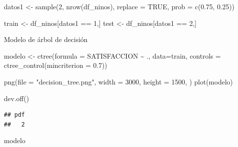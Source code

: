 \documentclass[
]{article}
\newenvironment{Shaded}{\begin{snugshade}}{\end{snugshade}}
\newcommand{\AttributeTok}[1]{\textcolor[rgb]{0.77,0.63,0.00}{#1}}
\newcommand{\ConstantTok}[1]{\textcolor[rgb]{0.00,0.00,0.00}{#1}}
\newcommand{\DecValTok}[1]{\textcolor[rgb]{0.00,0.00,0.81}{#1}}
\newcommand{\FloatTok}[1]{\textcolor[rgb]{0.00,0.00,0.81}{#1}}
\newcommand{\FunctionTok}[1]{\textcolor[rgb]{0.00,0.00,0.00}{#1}}
\newcommand{\NormalTok}[1]{#1}
\newcommand{\OtherTok}[1]{\textcolor[rgb]{0.56,0.35,0.01}{#1}}
\newcommand{\SpecialCharTok}[1]{\textcolor[rgb]{0.00,0.00,0.00}{#1}}
\newcommand{\StringTok}[1]{\textcolor[rgb]{0.31,0.60,0.02}{#1}}
\begin{document}
\begin{Shaded}
\begin{Highlighting}[]
\NormalTok{datos1 }\OtherTok{\textless{}{-}} \FunctionTok{sample}\NormalTok{(}\DecValTok{2}\NormalTok{, }\FunctionTok{nrow}\NormalTok{(df\_ninos),}
                   \AttributeTok{replace =} \ConstantTok{TRUE}\NormalTok{,}
                    \AttributeTok{prob =} \FunctionTok{c}\NormalTok{(}\FloatTok{0.75}\NormalTok{, }\FloatTok{0.25}\NormalTok{))}

\NormalTok{train }\OtherTok{\textless{}{-}}\NormalTok{ df\_ninos[datos1 }\SpecialCharTok{==} \DecValTok{1}\NormalTok{,]}
\NormalTok{test }\OtherTok{\textless{}{-}}\NormalTok{ df\_ninos[datos1 }\SpecialCharTok{==} \DecValTok{2}\NormalTok{,]}
\end{Highlighting}
\end{Shaded}

Modelo de árbol de decisión

\begin{Shaded}
\begin{Highlighting}[]
\NormalTok{modelo }\OtherTok{\textless{}{-}} \FunctionTok{ctree}\NormalTok{(}\AttributeTok{formula =}\NormalTok{ SATISFACCION }\SpecialCharTok{\textasciitilde{}}\NormalTok{ ., }\AttributeTok{data=}\NormalTok{train, }
                \AttributeTok{controls =} \FunctionTok{ctree\_control}\NormalTok{(}\AttributeTok{mincriterion =} \FloatTok{0.7}\NormalTok{))}
\end{Highlighting}
\end{Shaded}

\begin{Shaded}
\begin{Highlighting}[]
\FunctionTok{png}\NormalTok{(}\AttributeTok{file =} \StringTok{"decision\_tree.png"}\NormalTok{, }\AttributeTok{width =} \DecValTok{3000}\NormalTok{, }\AttributeTok{height =} \DecValTok{1500}\NormalTok{, )}
\FunctionTok{plot}\NormalTok{(modelo)}

\FunctionTok{dev.off}\NormalTok{()}
\end{Highlighting}
\end{Shaded}

\begin{verbatim}
## pdf 
##   2
\end{verbatim}

\begin{Shaded}
\begin{Highlighting}[]
\NormalTok{modelo}
\end{Highlighting}
\end{Shaded}
\end{document}
